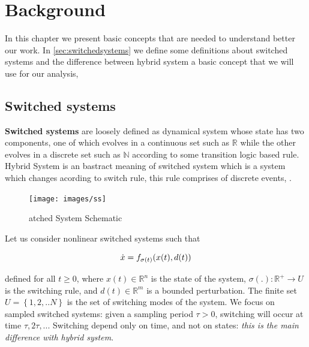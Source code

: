 \chapter{Background} %

\label{ch:background}
In this chapter we present basic concepts that are needed to understand better
our work. In \autoref{sec:switchedsystems} we define some definitions about switched systems 
and the difference between hybrid system a basic concept that we will use for our
analysis,


\clearpage


\section{Switched systems}
\label{sec:switchedsystems}
    \textbf{Switched systems} are loosely defined as dynamical system whose state has
    two components, one of which evolves in a continuous set such as 
    $\mathbb{R}$  while the other evolves in a discrete set such as
    $\mathbb{N}$ according to some transition logic based rule. 
    Hybrid System is an bastract meaning of switched system which 
    is a system which changes acording to switch rule, this rule 
    comprises of discrete events, \citep{branicky1994stability}.

    \begin{figure}[!h]
        \begin{center}
            \texttt{[image: images/ss]}
            \caption{atched System Schematic}
        \end{center}
    \end{figure}

    Let us consider nonlinear switched systems such that

    \begin{equation}
        \dot x = f_{\sigma(t)}(x(t),d(t)) \\
    \end{equation}

    defined for all $t \geqslant 0$, where $x(t) \in \mathbb{R}^n$ is the state
    of the system, $\sigma(.): \mathbb{R}^+ \rightarrow U$ is the switching 
    rule, and $d(t) \in \mathbb{R}^m$ is a bounded perturbation. The finite
    set $U = \left\lbrace 1,2,.. N \right\rbrace$ is the set of switching
    modes of the system. We focus on sampled switched systems: given a sampling
    period $\tau > 0$, switching will occur at time $\tau, 2\tau, ...$ Switching 
    depend only on time, and not on states: \emph{this is the main difference with 
    hybrid system}.

